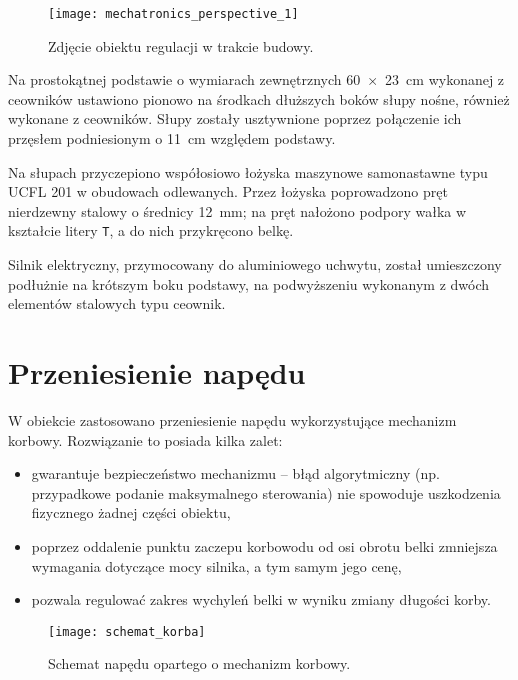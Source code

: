\begin{figure}[H]
	\centering
	\texttt{[image: mechatronics\_perspective\_1]}
	\caption{Zdjęcie obiektu regulacji w trakcie budowy.}
	\label{fig:mechatronics_perspective_1}
\end{figure}

Na prostokątnej podstawie o wymiarach zewnętrznych \SI{60 x 23}{cm} wykonanej z ceowników ustawiono pionowo na środkach dłuższych boków słupy nośne, również wykonane z ceowników. Słupy zostały usztywnione poprzez połączenie ich przęsłem podniesionym o \SI{11}{cm} względem podstawy.

Na słupach przyczepiono współosiowo łożyska maszynowe samonastawne typu UCFL 201 w obudowach odlewanych. Przez łożyska poprowadzono pręt nierdzewny stalowy o średnicy \SI{12}{mm}; na pręt nałożono podpory wałka w kształcie litery \texttt{T}, a do nich przykręcono belkę.

Silnik elektryczny, przymocowany do aluminiowego uchwytu, został umieszczony podłużnie na krótszym boku podstawy, na podwyższeniu wykonanym z dwóch elementów stalowych typu ceownik.


\section{Przeniesienie napędu}
\label{sec:ch2_przeniesienie_napedu}

W obiekcie zastosowano przeniesienie napędu wykorzystujące mechanizm korbowy. Rozwiązanie to posiada kilka zalet:

\begin{itemize}
	\item gwarantuje bezpieczeństwo mechanizmu -- błąd algorytmiczny (np. przypadkowe podanie maksymalnego sterowania) nie spowoduje uszkodzenia fizycznego żadnej części obiektu,
	\item poprzez oddalenie punktu zaczepu korbowodu od osi obrotu belki zmniejsza wymagania dotyczące mocy silnika, a tym samym jego cenę,
	\item pozwala regulować zakres wychyleń belki w wyniku zmiany długości korby.
\end{itemize}

\begin{figure}[H]
	\centering
    \texttt{[image: schemat\_korba]}
	\caption{Schemat napędu opartego o mechanizm korbowy.}
	\label{fig:schemat_korba}
\end{figure}

